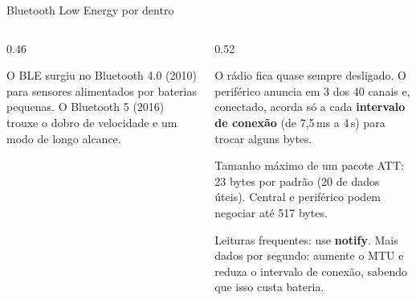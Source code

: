 \begin{frame}{Bluetooth Low Energy por dentro}
  \begin{columns}[c]
    \begin{column}{0.46\textwidth}
      \centering
      \begin{historia}
        O BLE surgiu no Bluetooth 4.0 (2010) para sensores alimentados por baterias pequenas. O Bluetooth 5 (2016) trouxe o dobro de velocidade e um modo de longo alcance.
      \end{historia}
    \end{column}
    \begin{column}{0.52\textwidth}
      \begin{pordentro}
        O rádio fica quase sempre desligado. O periférico anuncia em 3 dos 40 canais e, conectado, acorda só a cada \textbf{intervalo de conexão} (de 7,5\,ms a 4\,s) para trocar alguns bytes.
      \end{pordentro}
      \begin{definicao}[MTU]
        Tamanho máximo de um pacote ATT: 23 bytes por padrão (20 de dados úteis). Central e periférico podem negociar até 517 bytes.
      \end{definicao}
      \begin{dica}
        Leituras frequentes: use \textbf{notify}. Mais dados por segundo: aumente o MTU e reduza o intervalo de conexão, sabendo que isso custa bateria.
      \end{dica}
    \end{column}
  \end{columns}
\end{frame}

